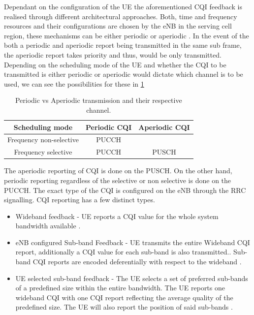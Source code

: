 \documentclass{article}
\begin{document}
Dependant on the configuration of the UE the aforementioned CQI feedback is realised through different architectural approaches. Both, time and frequency resources and their configurations are chosen by the eNB in the serving cell region, these mechanisms can be either periodic or aperiodic \cite[Section 7.2]{ETSITS136213}. In the event of the both a periodic and aperiodic report being transmitted in the same sub frame, the aperiodic report takes priority and thus, would be only transmitted. Depending on the scheduling mode of the UE and whether the CQI to be transmitted is either periodic or aperiodic would dictate which channel is to be used, we can see the possibilities for these in \cref{tab:cqi_aperiod_sel}
\begin{table}[H]
        \centering
     \begin{tabular}{||c c c||} 
     \hline
     Scheduling mode & Periodic CQI & Aperiodic CQI  \\ [0.1ex] 
     \hline\hline
     Frequency non-selective & PUCCH &  \\ 
     \hline
     Frequency selective  & PUCCH & PUSCH\\
     \hline
    \end{tabular}
    \caption{Periodic vs Aperiodic transmission and their respective channel.}
    \label{tab:cqi_aperiod_sel}
\end{table}
The aperiodic reporting of CQI is done on the PUSCH. On the other hand, periodic reporting regardless of the selective or non selective is done on the PUCCH. The exact type of the CQI is configured on the eNB through the RRC signalling. CQI reporting has a few distinct types. 
\begin{itemize}
    \item Wideband feedback - UE reports a CQI value for the whole system bandwidth available \cite[Section 10.2.1.1]{umts_sesia}.
    \item eNB configured Sub-band Feedback - UE transmits the entire Wideband CQI report, additionally a CQI value for each sub-band is also transmitted.. Sub-band CQI reports are encoded deferentially with respect to the wideband \cite[Section 10.2.1.1]{umts_sesia}.
    \item UE selected sub-band feedback - The UE selects a set of preferred sub-bands of a predefined size within the entire bandwidth.  The UE reports one wideband CQI with one CQI report reflecting the average quality of the predefined size. The UE will also report the position of said sub-bands \cite[Section 10.2.1.1]{umts_sesia}.
\end{itemize}
\end{document}
